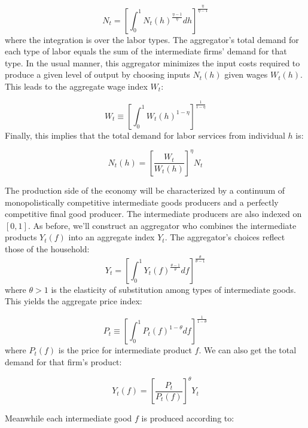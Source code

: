 \documentclass[12pt,a4paper]{scrartcl}            %
\begin{document}
\begin{equation*}
    N_t = \left[ \int_{0}^{1} N_t(h)^{ \frac{\eta - 1}{\eta} } dh \right]^{ \frac{\eta}{\eta - 1} }
\end{equation*}
where the integration is over the labor types. The aggregator's total demand for each type of labor equals the sum of the intermediate firms' demand for that type.
In the usual manner, this aggregator minimizes the input costs required to produce a given level of output by choosing inputs $N_t(h)$ given wages $W_t(h)$.  This leads to the aggregate wage index $W_t$:

\begin{equation*}
    W_t \equiv \left[ \int_{0}^{1} W_t(h)^{ 1 - \eta }  \right]^{ \frac{1}{1 - \eta} }
\end{equation*}
Finally, this implies that the total demand for labor services from individual $h$ is:

\begin{equation*}
    N_t(h) = \left[ \frac{W_t}{W_t(h)}  \right]^{\eta}N_t
\end{equation*}


The production side of the economy will be characterized by a continuum of monopolistically competitive  intermediate goods producers and a perfectly competitive final good producer.
The intermediate producers are also indexed on $[0, 1]$.
As before, we'll construct an aggregator who combines the intermediate products $Y_t(f)$ into an aggregate index $Y_t$.
The aggregator's choices reflect those of the household:
\begin{equation*}
    Y_t = \left[\int_{0}^{1} Y_t(f)^{ \frac{\theta - 1}{\theta}} df \right]^{ \frac{\theta}{\theta - 1} }
\end{equation*}
where $\theta > 1$ is the elasticity of substitution among types of intermediate goods.
This yields the aggregate price index:

\begin{equation*}
    P_t \equiv \left[\int_{0}^{1} P_t(f)^{1 - \theta} df \right]^{\frac{1}{1 - \theta}}
\end{equation*}
where $P_t(f)$ is the price for intermediate product $f$.
We can also get the total demand for that firm's product:

\begin{equation*}
    Y_t(f) = \left[ \frac{P_t}{P_t(f)}  \right]^{\theta} Y_t
\end{equation*}

Meanwhile each intermediate good $f$ is produced according to:
\end{document}
